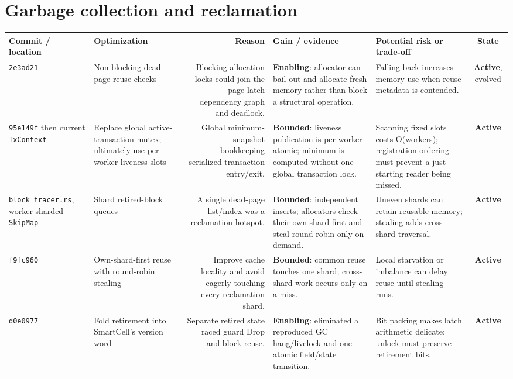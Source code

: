 \documentclass[10pt,a4paper,landscape]{article}
\newcommand{\code}[1]{\texttt{#1}}
\newcommand{\commit}[1]{\code{#1}}
\newcommand{\gainbounded}{\textbf{Bounded}}
\newcommand{\gainenabling}{\textbf{Enabling}}
\newcommand{\stateactive}{\textbf{Active}}
\begin{document}
\section{Garbage collection and reclamation}

\begin{longtable}{IORGKS}
\toprule
\textbf{Commit / location} & \textbf{Optimization} & \textbf{Reason} &
\textbf{Gain / evidence} & \textbf{Potential risk or trade-off} & \textbf{State} \\
\midrule
\endhead
\commit{2e3ad21} & Non-blocking dead-page reuse checks & Blocking allocation locks could
join the page-latch dependency graph and deadlock. & \gainenabling: allocator can bail out and
allocate fresh memory rather than block a structural operation. & Falling back increases
memory use when reuse metadata is contended. & \stateactive, evolved \\

\commit{95e149f} then current \code{TxContext} & Replace global active-transaction mutex;
ultimately use per-worker liveness slots & Global minimum-snapshot bookkeeping serialized
transaction entry/exit. & \gainbounded: liveness publication is per-worker atomic; minimum is
computed without one global transaction lock. & Scanning fixed slots costs O(workers);
registration ordering must prevent a just-starting reader being missed. & \stateactive \\

\code{block\_tracer.rs}, worker-sharded \code{SkipMap} & Shard retired-block queues & A
single dead-page list/index was a reclamation hotspot. & \gainbounded: independent inserts;
allocators check their own shard first and steal round-robin only on demand. & Uneven
shards can retain reusable memory; stealing adds cross-shard traversal. & \stateactive \\

\commit{f9fc960} & Own-shard-first reuse with round-robin stealing & Improve cache
locality and avoid eagerly touching every reclamation shard. & \gainbounded: common reuse
touches one shard; cross-shard work occurs only on a miss. & Local starvation or imbalance
can delay reuse until stealing runs. & \stateactive \\

\commit{d0e0977} & Fold retirement into SmartCell's version word & Separate retired state
raced guard Drop and block reuse. & \gainenabling: eliminated a reproduced GC hang/livelock
and one atomic field/state transition. & Bit packing makes latch arithmetic delicate;
unlock must preserve retirement bits. & \stateactive \\


\end{longtable}
\end{document}
